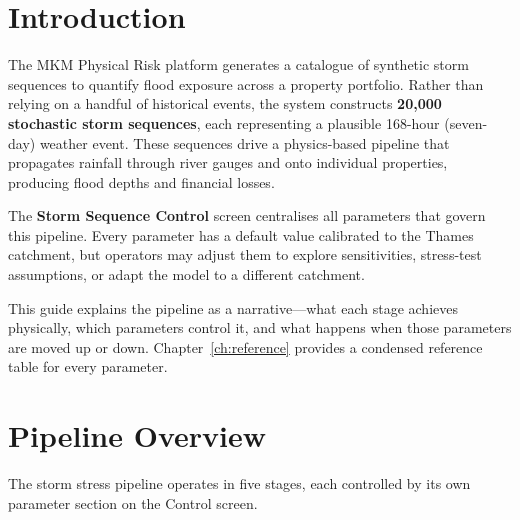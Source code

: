 \documentclass[11pt,a4paper]{article}
\begin{document}
\mkmtitlepage
\mkmlegalpage

\tableofcontents
\clearpage


\section{Introduction}

The MKM Physical Risk platform generates a catalogue of synthetic storm
sequences to quantify flood exposure across a property portfolio.  Rather
than relying on a handful of historical events, the system constructs
\textbf{20,000 stochastic storm sequences}, each representing a plausible
168-hour (seven-day) weather event.  These sequences drive a physics-based
pipeline that propagates rainfall through river gauges and onto individual
properties, producing flood depths and financial losses.

The \textbf{Storm Sequence Control} screen centralises all parameters that
govern this pipeline.  Every parameter has a default value calibrated to the
Thames catchment, but operators may adjust them to explore sensitivities,
stress-test assumptions, or adapt the model to a different catchment.

This guide explains the pipeline as a narrative---what each stage achieves
physically, which parameters control it, and what happens when those
parameters are moved up or down.  Chapter~\ref{ch:reference} provides a
condensed reference table for every parameter.


\section{Pipeline Overview}
\label{ch:overview}

The storm stress pipeline operates in five stages, each controlled by its
own parameter section on the Control screen.
\end{document}
